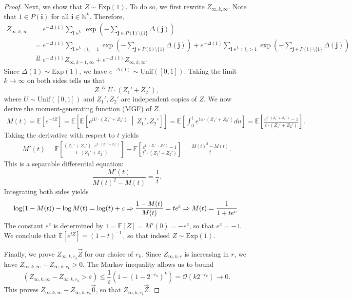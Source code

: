 \documentclass[10pt,a4paper]{amsart}
\newcommand{\E}{\mathbb{E}}
\newcommand{\bigO}{\mathcal{O}}
\providecommand{\N}{}
\providecommand{\P}{}
\begin{document}
\begin{proof}
Next, we show that $Z\sim\text{Exp}(1)$.
To do so, we first rewrite $Z_{\infty,k,\infty}$. Note that $1\in P(\bm{i})$ for all $\bm{i}\in\mathbb{N}^k$. Therefore,
\begin{align*}
Z_{\infty,k,\infty}
&=e^{-\Delta(1)}\sum_{\bm{i}\in\N^k}\exp\left(-\sum_{\bm{j}\in P(\bm{i})\setminus\{1\}}\Delta(\bm{j})\right)\\
&=e^{-\Delta(1)}\sum_{\bm{i}\in\N^k\ :\ i_1=1}\exp\left(-\sum_{\bm{j}\in P(\bm{i})\setminus\{1\}}\Delta(\bm{j})\right)+e^{-\Delta(1)}\sum_{\bm{i}\in\N^k\ :\ i_1>1}\exp\left(-\sum_{\bm{j}\in P(\bm{i})\setminus\{1\}}\Delta(\bm{j})\right)\\
&\stackrel{D}=e^{-\Delta(1)}Z_{\infty,k-1,\infty}+e^{-\Delta(1)}Z_{\infty,k,\infty}.
\end{align*}
Since $\Delta(1)\sim\text{Exp}(1)$, we have $e^{-\Delta(1)}\sim\text{Unif}([0,1])$. Taking the limit $k\to\infty$ on both sides tells us that
\[
Z\stackrel{D}=U\cdot(Z_{1}'+Z_{2}'),
\]
where $U\sim\text{Unif}([0,1])$ and $Z_{1}',Z_{2}'$ are independent copies of $Z$. We now derive the moment-generating function (MGF) of $Z$.
\begin{align*}
    M(t)=\E[e^{-tZ}]=\E\left[\E\left[e^{tU\cdot(Z_1'+Z_2')}\ \middle|\ Z_1',Z_2'\right]\right]=\E\left[\int_0^1e^{tu\cdot(Z_1'+Z_2')}du\right]=\E\left[\frac{e^{t\cdot(Z_1'+Z_2')}-1}{t\cdot(Z_1'+Z_2')}\right].
\end{align*}
Taking the derivative with respect to $t$ yields
\begin{align*}
    M'(t)
    =\E\left[\frac{(Z_1'+Z_2')\cdot e^{t\cdot(Z_1'+Z_2')}}{t\cdot(Z_1'+Z_2')}\right]-\E\left[\frac{e^{t\cdot(Z_1'+Z_2')}-1}{t^2\cdot(Z_1'+Z_2')}\right]=\frac{M(t)^2-M(t)}{t}.
\end{align*}
This is a separable differential equation:
$$
\frac{M'(t)}{M(t)^2-M(t)}=\frac1t.
$$
Integrating both sides yields
$$
\log(1-M(t))-\log M(t)=\log(t)+c\\
\Rightarrow \frac{1-M(t)}{M(t)}=te^c\\
\Rightarrow M(t)=\frac{1}{1+te^c}.
$$
The constant $e^c$ is determined by $1=\mathbb{E}[Z]=M'(0)=-e^{c}$, so that $e^c = -1$. We conclude that
\(
\E[e^{tZ}]=(1-t)^{-1},
\)
so that indeed $Z\sim\text{Exp}(1)$.

Finally, we prove $Z_{\infty,k,r_k}\stackrel\P\to Z$ for our choice of $r_k$.
Since $Z_{\infty,k,r}$ is increasing in $r$, we have $Z_{\infty,k,\infty}-Z_{\infty,k,r_k}>0$.
The Markov inequality allows us to bound
\[
\P(Z_{\infty,k,\infty}-Z_{\infty,k,r_k}>\varepsilon)\le\frac1\varepsilon\left(1-(1-2^{-r_k})^k\right)=\bigO(k2^{-r_k})\to0.
\]
This proves $Z_{\infty,k,\infty}-Z_{\infty,k,r_k}\stackrel\P\to0$, so that $Z_{\infty,k,r_k}\stackrel\P\to Z$.
\end{proof}
\end{document}
